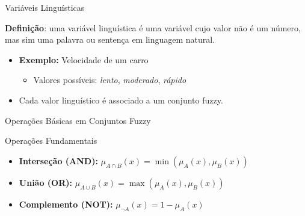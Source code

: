 \documentclass{beamer}
\begin{document}
\begin{frame}{Variáveis Linguísticas}
\footnotesize
    \begin{block}{}
        \textbf{Definição}: uma variável linguística é uma variável cujo valor não é um número, mas sim uma palavra ou sentença em linguagem natural.
    \end{block}
    \pause
    \begin{itemize}
        \item \textbf{Exemplo:} Velocidade de um carro
        \begin{itemize}
            \item Valores possíveis: \textit{lento}, \textit{moderado}, \textit{rápido}
        \end{itemize}
        \item Cada valor linguístico é associado a um conjunto fuzzy.
    \end{itemize}
    \pause
    \centering
\end{frame}

\begin{frame}{Operações Básicas em Conjuntos Fuzzy}
\footnotesize
    \begin{block}{Operações Fundamentais}
        \begin{itemize}
            \item \textbf{Interseção (AND):} \( \mu_{A \cap B}(x) = \min(\mu_A(x), \mu_B(x)) \)
            \item \textbf{União (OR):} \( \mu_{A \cup B}(x) = \max(\mu_A(x), \mu_B(x)) \)
            \item \textbf{Complemento (NOT):} \( \mu_{\neg A}(x) = 1 - \mu_A(x) \)
        \end{itemize}
    \end{block}
    \centering
\end{frame}
\end{document}
